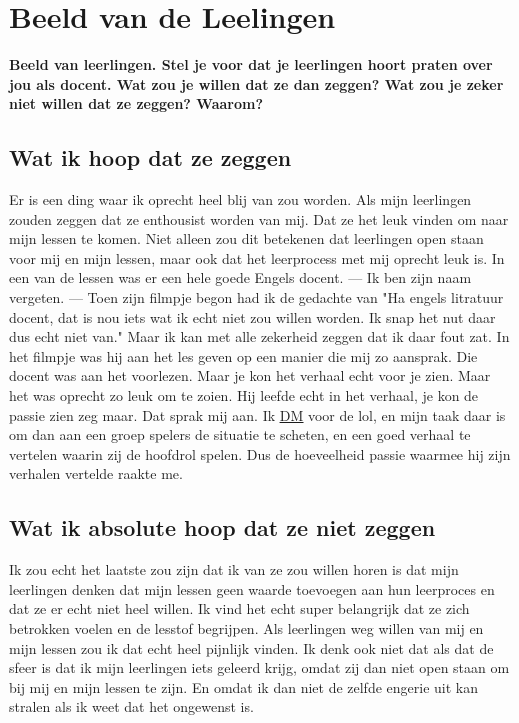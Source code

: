 \documentclass{article}
\begin{document}
    
    \section{Beeld van de Leelingen}
        \textbf{Beeld van leerlingen. Stel je voor dat je leerlingen hoort praten over jou als docent. Wat zou je willen dat ze dan zeggen? Wat zou je zeker niet willen dat ze zeggen? Waarom?}
        \subsection{Wat ik hoop dat ze zeggen}
            Er is een ding waar ik oprecht heel blij van zou worden. Als mijn leerlingen zouden zeggen dat ze enthousist worden van mij. Dat ze het leuk vinden om naar mijn lessen te komen. Niet alleen zou dit betekenen dat leerlingen open staan voor mij en mijn lessen, maar ook dat het leerprocess met mij oprecht leuk is. 
            \bigskip
            \noindent In een van de lessen was er een hele goede Engels docent. — Ik ben zijn naam vergeten. — Toen zijn filmpje begon had ik de gedachte van "Ha engels litratuur docent, dat is nou iets wat ik echt niet zou willen worden. Ik snap het nut daar dus echt niet van." Maar ik kan met alle zekerheid zeggen dat ik daar fout zat. 
            \bigskip
            \noindent In het filmpje was hij aan het les geven op een manier die mij zo aansprak. Die docent was aan het voorlezen. Maar je kon het verhaal echt voor je zien. Maar het was oprecht zo leuk om te zoien. Hij leefde echt in het verhaal, je kon de passie zien zeg maar. Dat sprak mij aan. Ik \hyperlink{https://en.wikipedia.org/wiki/Dungeon_Master}{\underline{DM}} voor de lol, en mijn taak daar is om dan aan een groep spelers de situatie te scheten, en een goed verhaal te vertelen waarin zij de hoofdrol spelen. Dus de hoeveelheid passie waarmee hij zijn verhalen vertelde raakte me.
        \subsection{Wat ik absolute hoop dat ze niet zeggen}
            Ik zou echt het laatste zou zijn dat ik van ze zou willen horen is dat mijn leerlingen denken dat mijn lessen geen waarde toevoegen aan hun leerproces en dat ze er echt niet heel willen. Ik vind het echt super belangrijk dat ze zich betrokken voelen en de lesstof begrijpen. Als leerlingen weg willen van mij en mijn lessen zou ik dat echt heel pijnlijk vinden. Ik denk ook niet dat als dat de sfeer is dat ik mijn leerlingen iets geleerd krijg, omdat zij dan niet open staan om bij mij en mijn lessen te zijn. En omdat ik dan niet de zelfde engerie uit kan stralen als ik weet dat het ongewenst is.
    \newpage
\end{document}
